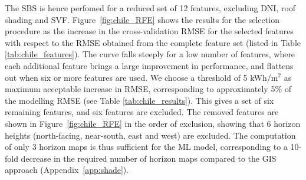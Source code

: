 The SBS is hence perfomed for a reduced set of 12 features, excluding DNI, roof shading and SVF. Figure~\ref{fig:chile_RFE} shows the results for the selection procedure as the increase in the cross-validation RMSE for the selected features with respect to the RMSE obtained from the complete feature set (listed in Table \ref{tab:chile_features}). The curve falls steeply for a low number of features, where each additional feature brings a large improvement in performance, and flattens out when six or more features are used. We choose a threshold of 5 kWh/m$^2$ as maximum acceptable increase in RMSE, corresponding to approximately 5\% of the modelling RMSE (see Table \ref{tab:chile_results}). This gives a set of six remaining features, and six features are excluded. The removed features are shown in Figure~\ref{fig:chile_RFE} in the order of exclusion, showing that 6 horizon heights (north-facing, near-south, east and west) are excluded.
The computation of only 3 horizon maps is thus sufficient for the ML model, corresponding to a 10-fold decrease in the required number of horizon maps compared to the GIS approach (Appendix~\ref{app:shade}). 

